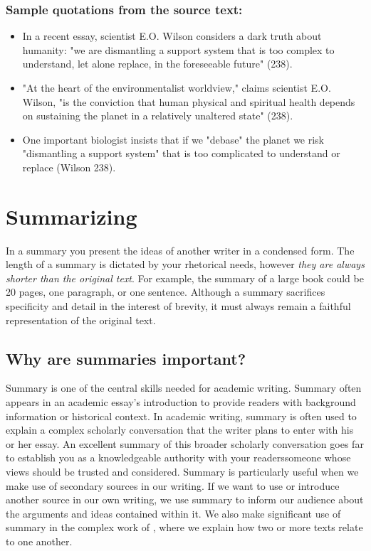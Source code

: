 \subsubsection*{Sample quotations from the source text:}

\begin{itemize}

\item In a recent essay, scientist E.O. Wilson considers a dark truth about humanity: "we are dismantling a support system that is too complex to understand, let alone replace, in the foreseeable future" (238).

\item "At the heart of the environmentalist worldview," claims scientist E.O. Wilson, "is the conviction that human physical and spiritual health depends on sustaining the planet in a relatively unaltered state" (238).

\item One important biologist insists that if we "debase" the planet we risk "dismantling a support system" that is too complicated to understand or replace (Wilson 238).

\end{itemize}

\hypertarget{summary}{}
\section{Summarizing}
In a summary you present the ideas of another writer in a condensed form. The
length of a summary is dictated by your rhetorical needs, however \emph{they are
always shorter than the original text}. For example, the summary of a large
book could be 20 pages, one paragraph, or one sentence. Although a summary
sacrifices specificity and detail in the interest of brevity, it must always
remain a faithful representation of the original text.


\subsection {Why are summaries important?}

Summary is one of the central skills needed for academic writing. Summary often appears
in an academic essay's introduction to provide readers with background information or historical context. In academic writing, summary is often used to explain a complex scholarly conversation that the writer plans to enter with his or her essay. An excellent summary of this broader scholarly conversation goes far to establish you as a knowledgeable authority with your readers\textemdash someone whose views should be trusted and considered. Summary is particularly useful when we make use of secondary sources in our writing. If we want to use or introduce another source in our own writing, we use summary to inform our audience about the arguments and ideas contained within it. We also make significant use of summary in the complex work of \hyperlink{synthesis}{\color{Ahrenge}{synthesis}}, where we explain how two or more texts relate to one another. 

